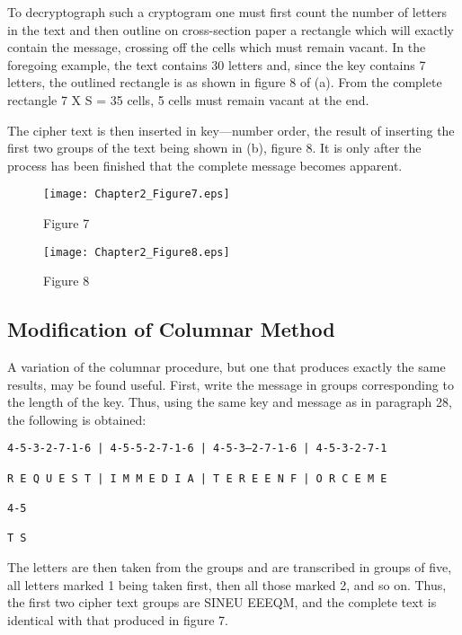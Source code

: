 \mypara To decryptograph such a cryptogram one must first count the
number of letters in the text and then outline on cross-section paper a
rectangle which will exactly contain the message, crossing off the cells
which must remain vacant. In the foregoing example, the text contains
30 letters and, since the key contains 7 letters, the outlined rectangle is as
shown in figure 8 of (a). From the complete rectangle 7 X S = 35 cells,
5 cells must remain vacant at the end.

\mypara The cipher text is then inserted in key—number order, the result of
inserting the first two groups of the text being shown in (b), figure 8.
It is only after the process has been finished that the complete message
becomes apparent.

\begin{figure}[h]
  \centering
    \texttt{[image: Chapter2\_Figure7.eps]}
    \label{fig:Figure 7}
    \caption{Figure 7}
\end{figure}

\begin{figure}[h]
  \centering
    \texttt{[image: Chapter2\_Figure8.eps]}
    \label{fig:Figure 8}
    \caption{Figure 8}
\end{figure}

\subsection{Modification of Columnar Method}

A variation of the columnar procedure, but one that produces exactly
the same results, may be found useful. First, write the message in groups
corresponding to the length of the key. Thus, using the same key and
message as in paragraph 28, the following is obtained:

\begin{verbatim}
4-5-3-2-7-1-6 | 4-5-5-2-7-1-6 | 4-5-3—2-7-1-6 | 4-5-3-2-7-1

R E Q U E S T | I M M E D I A | T E R E E N F | O R C E M E

4-5

T S
\end{verbatim}

The letters are then taken from the groups and are transcribed in groups
of five, all letters marked 1 being taken first, then all those marked 2, and
so on. Thus, the first two cipher text groups are SINEU EEEQM,
and the complete text is identical with that produced in figure 7.

